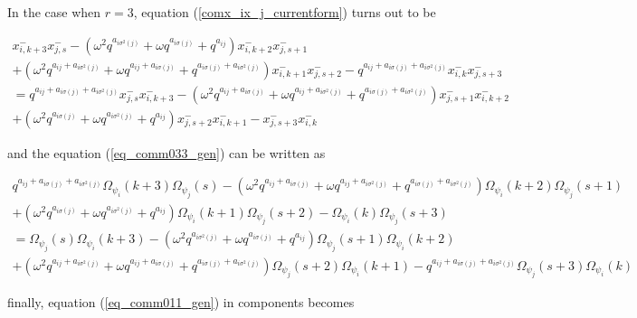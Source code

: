\documentclass[12pt]{amsart}
\numberwithin{equation}{section}
\begin{document}
In the case when $r=3$, equation (\ref{comx_ix_j_currentform}) turns out to be

\begin{multline}\label{Kas_commxx_r3}
    x_{i,k+3}^-x_{j,s}^- - (\omega^2q^{a_{i\sigma^2(j)}} + \omega q^{a_{i\sigma(j)}} + q^{a_{ij}})x_{i,k+2}^-x_{j,s+1}^-\\
    +  (\omega^2q^{a_{ij} + a_{i\sigma^2(j)}} + \omega q^{a_{ij} + a_{i\sigma(j)}} + q^{a_{i\sigma(j)} + a_{i\sigma^2(j)}})x_{i,k+1}^-x_{j,s+2}^- - q^{a_{ij} + a_{i\sigma(j)} + a_{i\sigma^2(j)}}x_{i,k}^-x_{j,s+3}^-\\
    = q^{a_{ij} + a_{i\sigma(j)} + a_{i\sigma^2(j)}}x_{j,s}^-x_{i,k+3}^- - (\omega^2q^{a_{ij} + a_{i\sigma(j)}} + \omega q^{a_{ij} + a_{i\sigma^2(j)}} + q^{a_{i\sigma(j)} + a_{i\sigma^2(j)}})x_{j,s+1}^-x_{i,k+2}^-\\
    + (\omega^2q^{a_{i\sigma(j)}} + \omega q^{a_{i\sigma^2(j)}} + q^{a_{ij}})x_{j,s+2}^-x_{i,k+1}^- -x_{j,s+3}^-x_{i,k}^-
\end{multline}


and the equation (\ref{eq_comm033_gen}) can be written as

\begin{multline}\label{Kas_commOO_r3}
    q^{a_{ij} + a_{i\sigma(j)} + a_{i\sigma^2(j)}}\Omega_{\psi_i}(k+3)\Omega_{\psi_j}(s) - (\omega^2q^{a_{ij} + a_{i\sigma(j)}} + \omega q^{a_{ij} + a_{i\sigma^2(j)}} + q^{a_{i\sigma(j)} + a_{i\sigma^2(j)}})\Omega_{\psi_i}(k+2)\Omega_{\psi_j}(s+1)\\
    + (\omega^2q^{a_{i\sigma(j)}} + \omega q^{a_{i\sigma^2(j)}} + q^{a_{ij}})\Omega_{\psi_i}(k+1)\Omega_{\psi_j}(s+2) - \Omega_{\psi_i}(k)\Omega_{\psi_j}(s+3)\\
    = \Omega_{\psi_j}(s)\Omega_{\psi_i}(k+3) - (\omega^2q^{a_{i\sigma^2(j)}} + \omega q^{a_{i\sigma(j)}} + q^{a_{ij}})\Omega_{\psi_j}(s+1)\Omega_{\psi_i}(k+2)\\ 
    +  (\omega^2q^{a_{ij} + a_{i\sigma^2(j)}} + \omega q^{a_{ij} + a_{i\sigma(j)}} + q^{a_{i\sigma(j)} + a_{i\sigma^2(j)}})\Omega_{\psi_j}(s+2)\Omega_{\psi_i}(k+1) - q^{a_{ij} + a_{i\sigma(j)} + a_{i\sigma^2(j)}}\Omega_{\psi_j}(s+3)\Omega_{\psi_i}(k)
\end{multline}

finally, equation (\ref{eq_comm011_gen}) in components becomes
\end{document}
